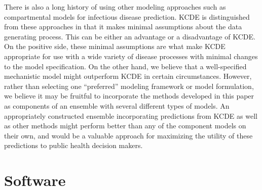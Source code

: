 \documentclass[times, doublespace]{simauth}\usepackage[]{graphicx}\usepackage[]{color}
\begin{document}
There is also a long history of using other modeling approaches such as
compartmental models for infectious disease prediction.  KCDE is distinguished
from these approaches in that it makes minimal assumptions about the data generating process.
This can be either an advantage or a disadvantage of KCDE.  On the positive
side, these minimal assumptions are what make KCDE appropriate for use with a
wide variety of disease processes with minimal changes to the model
specification.  On the other hand, we believe that a well-specified
mechanistic model might outperform KCDE in certain circumstances.
However, rather than selecting one ``preferred'' modeling framework or
model formulation, we believe it may be fruitful to incorporate the methods
developed in this paper as components of an ensemble with several
different types of models.
An appropriately constructed ensemble incorporating predictions from KCDE as
well as other methods might perform better than any
of the component models on their own, and would be a valuable approach for
maximizing the utility of these predictions to public health decision makers.

\section{Software}
\end{document}
